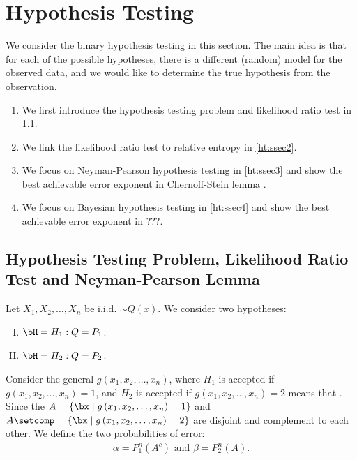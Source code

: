 \documentclass{article}
\begin{document}
\section{Hypothesis Testing}\label{sec:ht}
We consider the binary hypothesis testing in this section.  The main idea is that for each of the possible hypotheses, there is a different (random) model for the observed data, and we would like to determine the true hypothesis from the observation. 
\begin{enumerate}
    \item We first introduce the hypothesis testing problem and likelihood ratio test in \cref{ht:ssec1}.
    \item We link the likelihood ratio test to relative entropy in \cref{ht:ssec2}.
    \item We focus on Neyman-Pearson hypothesis testing in \cref{ht:ssec3} and show the best achievable error exponent in Chernoff-Stein lemma \blue{[cref]}.
    \item We focus on Bayesian hypothesis testing in \cref{ht:ssec4} and show the best achievable error exponent in ???\blue{[cref]}.
\end{enumerate}


\subsection{Hypothesis Testing Problem, Likelihood Ratio Test and Neyman-Pearson Lemma}\label{ht:ssec1}

Let $X_{1}, X_{2}, \ldots, X_{n}$ be i.i.d. $\sim Q(x)$. We consider two hypotheses:
\begin{enumerate}[I.]
    \item $\bH=H_{1}: Q=P_{1}$.
 \item $\bH=H_{2}: Q=P_{2}$.
\end{enumerate}

Consider the general  $g\left(x_{1}, x_{2}, \ldots, x_{n}\right)$, where  $H_{1}$ is accepted if $g\left(x_{1}, x_{2}, \ldots, x_{n}\right)=1$, and  $H_{2}$ is accepted if $g\left(x_{1}, x_{2}, \ldots, x_{n}\right)=2$
means that . Since the  $A = \left\{\bx\mid g\left(x_{1}, x_{2}, \ldots, x_{n}\right)=1 \right\}$ and $A\setcomp = \left\{\bx\mid g\left(x_{1}, x_{2}, \ldots, x_{n}\right)=2 \right\}$ are disjoint and complement to each other. We define the two probabilities of error:
\begin{align*}
\alpha=P_{1}^{n}\left(A^{c}\right) \text{ and } \beta=P_{2}^{n}\left(A\right).
\end{align*}
\end{document}
